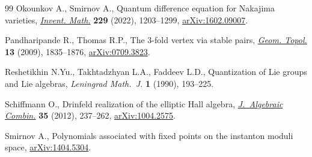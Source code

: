 \documentclass[10pt,a4paper]{amsart}
\providecommand{\LastPageEnding}{}
\numberwithin{equation}{section}
\begin{document}
\begin{thebibliography}{99}
Okounkov A., Smirnov A., Quantum difference equation for {N}akajima varieties,
\href{https://doi.org/10.1007/s00222-022-01125-w}{\textit{Invent. Math.}} \textbf{229} (2022), 1203--1299,
 \href{https://arxiv.org/abs/1602.09007}{arXiv:1602.09007}.

Pandharipande R., Thomas R.P., The 3-fold vertex via stable pairs,
 \href{https://doi.org/10.2140/gt.2009.13.1835}{\textit{Geom. Topol.}} \textbf{13} (2009), 1835--1876, \href{https://arxiv.org/abs/0709.3823}{arXiv:0709.3823}.

Reshetikhin N.{\relax Yu}., Takhtadzhyan L.A., Faddeev L.D., Quantization of
 {L}ie groups and {L}ie algebras, \textit{Leningrad Math.~J.} \textbf{1}
 (1990), 193--225.

Schiffmann O., Drinfeld realization of the elliptic {H}all algebra,
 \href{https://doi.org/10.1007/s10801-011-0302-8}{\textit{J.~Algebraic Combin.}} \textbf{35} (2012), 237--262,
 \href{https://arxiv.org/abs/1004.2575}{arXiv:1004.2575}.

Smirnov A., Polynomials associated with fixed points on the instanton moduli
 space, \href{https://arxiv.org/abs/1404.5304}{arXiv:1404.5304}.

\end{thebibliography}\LastPageEnding
\end{document}

